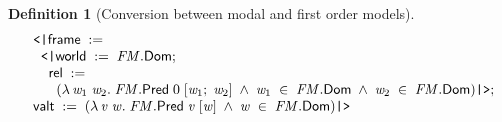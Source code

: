 \documentclass[letterpaper]{article}
\newtheorem{defn}{Definition}
\newenvironment{holmath}{\begin{displaymath}\begin{array}{l}}{\end{array}\end{displaymath}\ignorespacesafterend}
\begin{document}
\begin{defn}[Conversion between modal and first order models]
\begin{holmath}
\;\;\HOLTokenLeftrec{}\HOLFieldName{frame}\;:=\\
\;\;\;\;\HOLTokenLeftrec{}\HOLFieldName{world}\;:=\;\HOLFreeVar{FM}.\HOLFieldName{Dom};\\
\;\;\;\;\;\;\HOLFieldName{rel}\;:=\\
\;\;\;\;\;\;\;\;(\HOLTokenLambda{}\HOLBoundVar{w\sb{\mathrm{1}}}\;\HOLBoundVar{w\sb{\mathrm{2}}}.\;\HOLFreeVar{FM}.\HOLFieldName{Pred}\;\HOLNumLit{0}\;[\HOLBoundVar{w\sb{\mathrm{1}}};\;\HOLBoundVar{w\sb{\mathrm{2}}}]\;\HOLSymConst{\HOLTokenConj{}}\;\HOLBoundVar{w\sb{\mathrm{1}}}\;\HOLSymConst{\HOLTokenIn{}}\;\HOLFreeVar{FM}.\HOLFieldName{Dom}\;\HOLSymConst{\HOLTokenConj{}}\;\HOLBoundVar{w\sb{\mathrm{2}}}\;\HOLSymConst{\HOLTokenIn{}}\;\HOLFreeVar{FM}.\HOLFieldName{Dom})\HOLTokenRightrec{};\\
\;\;\HOLFieldName{valt}\;:=\;(\HOLTokenLambda{}\HOLBoundVar{v}\;\HOLBoundVar{w}.\;\HOLFreeVar{FM}.\HOLFieldName{Pred}\;\HOLBoundVar{v}\;[\HOLBoundVar{w}]\;\HOLSymConst{\HOLTokenConj{}}\;\HOLBoundVar{w}\;\HOLSymConst{\HOLTokenIn{}}\;\HOLFreeVar{FM}.\HOLFieldName{Dom})\HOLTokenRightrec{}
\end{holmath}
\end{defn}
\end{document}
